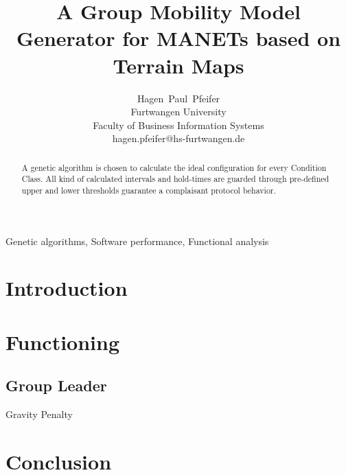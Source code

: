 \documentclass[journal]{IEEEtran}
\begin{document}
\newcommand{\ra}[1]{\renewcommand{\arraystretch}{#1}}

\title{A Group Mobility Model Generator for MANETs based on Terrain Maps}

\author{Hagen~Paul~Pfeifer\\Furtwangen University\\Faculty of Business
Information Systems\\hagen.pfeifer@hs-furtwangen.de}



\maketitle


\begin{abstract}
A genetic algorithm is chosen to calculate the ideal configuration for every
Condition Class. All kind of calculated intervals and hold-times are guarded
through pre-defined upper and lower thresholds guarantee a complaisant protocol
behavior.
\end{abstract}

% 
\begin{keywords}
Genetic algorithms, Software performance, Functional analysis
\end{keywords}
% 
\IEEEpeerreviewmaketitle


\section{Introduction}

\section{Functioning}

\subsection{Group Leader}

Gravity Penalty

\section{Conclusion}


\nocite{*}


\end{document}
